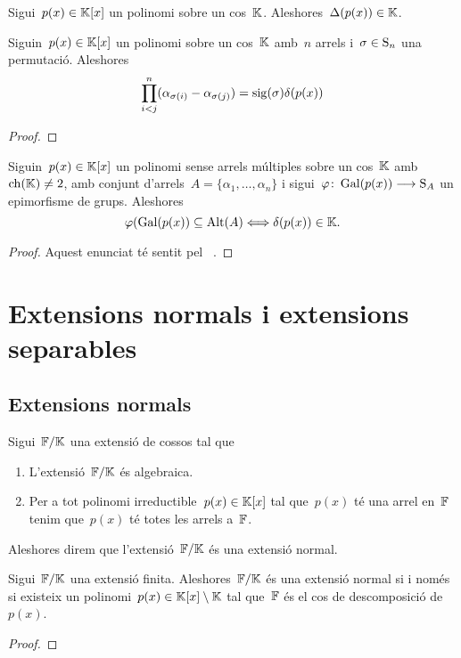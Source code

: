 \documentclass[../../Main.tex]{subfiles}
\begin{document}
	\begin{proposition}
		\label{prop:el discriminant pertany al cos del polinomi}
		Sigui~\(p(x)\in\mathbb{K}[x]\) un polinomi sobre un cos~\(\mathbb{K}\).
		Aleshores~\(\Delta(p(x))\in\mathbb{K}\).
	\end{proposition}
	\begin{lemma}
		\label{lema:discriminant}
		Siguin~\(p(x)\in\mathbb{K}[x]\) un polinomi sobre un cos~\(\mathbb{K}\) amb~\(n\) arrels i~\(\sigma\in\operatorname{S}_{n}\) una permutació.
		Aleshores
		\[
		    \prod_{i<j}^{n}(\alpha_{\sigma(i)}-\alpha_{\sigma(j)})=\operatorname{sig}(\sigma)\delta(p(x))
		\]
		\begin{proof}
		\end{proof}
	\end{lemma}
	\begin{corollary}
		\label{cor:l'arrel del discriminant d'un polinomi pertany al cos si i només si el grup de Galois del polinomi és un subgrup dels alternats de les arrels}
		Siguin~\(p(x)\in\mathbb{K}[x]\) un polinomi sense arrels múltiples sobre un cos~\(\mathbb{K}\) amb~\(\operatorname{ch}(\mathbb{K})\neq2\), amb conjunt d'arrels~\(A=\{\alpha_{1},\dots,\alpha_{n}\}\) i sigui~\(\varphi\colon\operatorname{Gal}(p(x))\longrightarrow\operatorname{S}_{A}\) un epimorfisme de grups.
		Aleshores
		\[
		    \varphi(\operatorname{Gal}(p(x))\subseteq\operatorname{Alt}(A)\Longleftrightarrow\delta(p(x))\in\mathbb{K}.
		\]
		\begin{proof}
			Aquest enunciat té sentit pel \corollari~.
		\end{proof}
	\end{corollary}
	
	\section{Extensions normals i extensions separables}
\subsection{Extensions normals}
	\begin{definition}
		\label{def:extensió normal}
		Sigui~\(\mathbb{F}/\mathbb{K}\) una extensió de cossos tal que
		\begin{enumerate}
			\item L'extensió~\(\mathbb{F}/\mathbb{K}\) és algebraica.
			\item Per a tot polinomi irreductible~\(p(x)\in\mathbb{K}[x]\) tal que~\(p(x)\) té una arrel en~\(\mathbb{F}\) tenim que~\(p(x)\) té totes les arrels a~\(\mathbb{F}\).
		\end{enumerate}
		Aleshores direm que l'extensió~\(\mathbb{F}/\mathbb{K}\) és una extensió normal.
	\end{definition}
	\begin{theorem}
		\label{thm:Teorema de normalitat}
		Sigui~\(\mathbb{F}/\mathbb{K}\) una extensió finita.
		Aleshores~\(\mathbb{F}/\mathbb{K}\) és una extensió normal si i només si existeix un polinomi~\(p(x)\in\mathbb{K}[x]\setminus\mathbb{K}\) tal que~\(\mathbb{F}\) és el cos de descomposició de~\(p(x)\).
		\begin{proof}
		\end{proof}
	\end{theorem}
\end{document}

